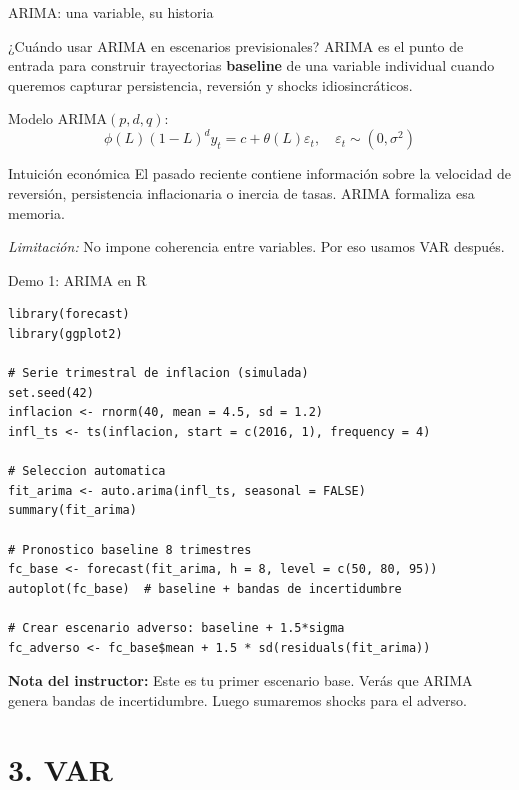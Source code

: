 \documentclass[10pt,aspectratio=169]{beamer}
\newcommand{\baseline}{\textcolor{MacropolTeal}{\textbf{baseline}}}
\begin{document}
\begin{frame}{ARIMA: una variable, su historia}
\begin{block}{¿Cuándo usar ARIMA en escenarios previsionales?}
ARIMA es el punto de entrada para construir trayectorias \baseline{} de una variable individual cuando queremos capturar persistencia, reversión y shocks idiosincráticos.
\end{block}

Modelo ARIMA$(p,d,q)$:
\[
\phi(L)(1-L)^d y_t = c + \theta(L)\varepsilon_t, \quad \varepsilon_t \sim (0,\sigma^2)
\]

\begin{block}{Intuición económica}
El pasado reciente contiene información sobre la velocidad de reversión, persistencia inflacionaria o inercia de tasas. ARIMA formaliza esa memoria.
\end{block}

\small \textit{Limitación:} No impone coherencia entre variables. Por eso usamos VAR después.
\end{frame}

\begin{frame}[fragile]{Demo 1: ARIMA en R}
\begin{lstlisting}
library(forecast)
library(ggplot2)

# Serie trimestral de inflacion (simulada)
set.seed(42)
inflacion <- rnorm(40, mean = 4.5, sd = 1.2)
infl_ts <- ts(inflacion, start = c(2016, 1), frequency = 4)

# Seleccion automatica
fit_arima <- auto.arima(infl_ts, seasonal = FALSE)
summary(fit_arima)

# Pronostico baseline 8 trimestres
fc_base <- forecast(fit_arima, h = 8, level = c(50, 80, 95))
autoplot(fc_base)  # baseline + bandas de incertidumbre

# Crear escenario adverso: baseline + 1.5*sigma
fc_adverso <- fc_base$mean + 1.5 * sd(residuals(fit_arima))
\end{lstlisting}

\textbf{Nota del instructor:} Este es tu primer escenario base. Verás que ARIMA genera bandas de incertidumbre. Luego sumaremos shocks para el adverso.
\end{frame}

\section{3. VAR}
\end{document}
